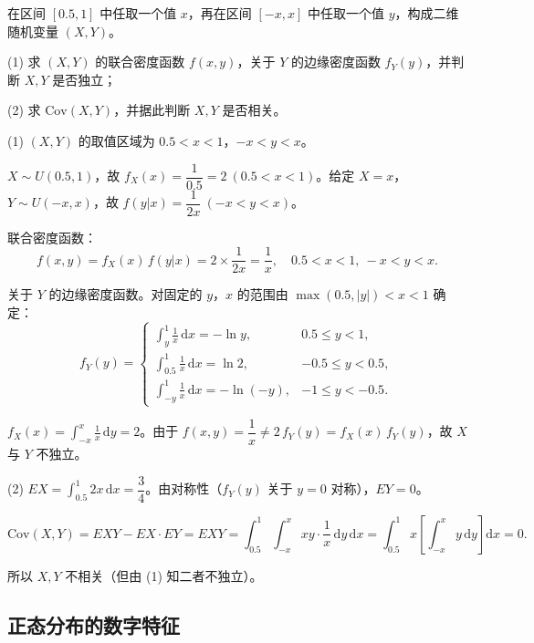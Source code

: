 ﻿\documentclass[lang=cn,11pt]{elegantbook}
\begin{document}
\begin{exercise}\label{exer:4-19-interval}
在区间 \([0.5, 1]\) 中任取一个值 \(x\)，再在区间 \([-x, x]\) 中任取一个值 \(y\)，构成二维随机变量 \((X,Y)\)。\par
(1) 求 \((X,Y)\) 的联合密度函数 \(f(x,y)\)，关于 \(Y\) 的边缘密度函数 \(f_Y(y)\)，并判断 \(X, Y\) 是否独立；\par
(2) 求 \(\mathrm{Cov}(X,Y)\)，并据此判断 \(X, Y\) 是否相关。
\end{exercise}

\begin{solution}
(1) \((X,Y)\) 的取值区域为 \(0.5 < x < 1\)，\(-x < y < x\)。

\(X \sim U(0.5, 1)\)，故 \(f_X(x) = \dfrac{1}{0.5} = 2\ (0.5 < x < 1)\)。给定 \(X = x\)，\(Y \sim U(-x, x)\)，故 \(f(y|x) = \dfrac{1}{2x}\ (-x < y < x)\)。

联合密度函数：
\[
f(x,y) = f_X(x)\,f(y|x) = 2 \times \frac{1}{2x} = \frac{1}{x},\quad 0.5 < x < 1,\ -x < y < x.
\]

关于 \(Y\) 的边缘密度函数。对固定的 \(y\)，\(x\) 的范围由 \(\max(0.5, |y|) < x < 1\) 确定：
\[
f_Y(y) = \begin{cases}
\displaystyle\int_y^1 \frac{1}{x}\,\mathrm{d}x = -\ln y, & 0.5 \leqslant y < 1, \\[8pt]
\displaystyle\int_{0.5}^1 \frac{1}{x}\,\mathrm{d}x = \ln 2, & -0.5 \leqslant y < 0.5, \\[8pt]
\displaystyle\int_{-y}^1 \frac{1}{x}\,\mathrm{d}x = -\ln(-y), & -1 \leqslant y < -0.5.
\end{cases}
\]

\(f_X(x) = \displaystyle\int_{-x}^{x} \frac{1}{x}\,\mathrm{d}y = 2\)。由于 \(f(x,y) = \dfrac{1}{x} \neq 2\,f_Y(y) = f_X(x)\,f_Y(y)\)，故 \(X\) 与 \(Y\) 不独立。

(2) \(EX = \displaystyle\int_{0.5}^{1} 2x\,\mathrm{d}x = \dfrac{3}{4}\)。由对称性（\(f_Y(y)\) 关于 \(y = 0\) 对称），\(EY = 0\)。

\[
\mathrm{Cov}(X,Y) = EXY - EX \cdot EY = EXY = \int_{0.5}^{1}\int_{-x}^{x} xy \cdot \frac{1}{x}\,\mathrm{d}y\,\mathrm{d}x = \int_{0.5}^{1} x\!\left[\int_{-x}^{x} y\,\mathrm{d}y\right]\mathrm{d}x = 0.
\]

所以 \(X, Y\) 不相关（但由 (1) 知二者不独立）。
\end{solution}

\subsection{正态分布的数字特征}
\end{document}
